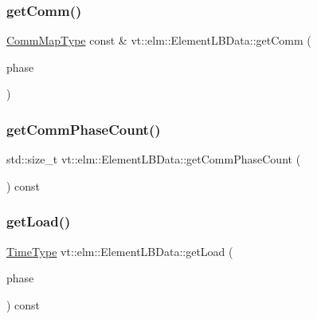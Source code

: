 \subsubsection{\texorpdfstring{get\+Comm()}{getComm()}}
{\footnotesize\ttfamily \hyperlink{namespacevt_1_1elm_a38487cb8896b9b4763efa9022fab560e}{Comm\+Map\+Type} const  \& vt\+::elm\+::\+Element\+L\+B\+Data\+::get\+Comm (\begin{DoxyParamCaption}\item[{\hyperlink{namespacevt_a46ce6733d5cdbd735d561b7b4029f6d7}{Phase\+Type} const \&}]{phase }\end{DoxyParamCaption})}

\mbox{\label{structvt_1_1elm_1_1_element_l_b_data_a5164aaf6b9aa619465454b7d24273f10}} 
\subsubsection{\texorpdfstring{get\+Comm\+Phase\+Count()}{getCommPhaseCount()}}
{\footnotesize\ttfamily std\+::size\+\_\+t vt\+::elm\+::\+Element\+L\+B\+Data\+::get\+Comm\+Phase\+Count (\begin{DoxyParamCaption}{ }\end{DoxyParamCaption}) const}

\mbox{\label{structvt_1_1elm_1_1_element_l_b_data_a3216bed5134fde4e1b363c92130aab88}} 
\subsubsection{\texorpdfstring{get\+Load()}{getLoad()}\hspace{0.1cm}{\footnotesize\ttfamily [1/2]}}
{\footnotesize\ttfamily \hyperlink{namespacevt_a876a9d0cd5a952859c72de8a46881442}{Time\+Type} vt\+::elm\+::\+Element\+L\+B\+Data\+::get\+Load (\begin{DoxyParamCaption}\item[{\hyperlink{namespacevt_a46ce6733d5cdbd735d561b7b4029f6d7}{Phase\+Type} const \&}]{phase }\end{DoxyParamCaption}) const}

